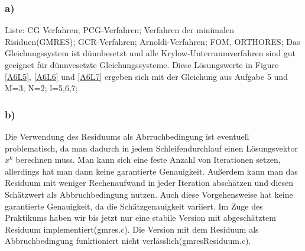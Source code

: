 \documentclass{report}
\begin{document}
	\subsubsection{a)}
	Liste: CG Verfahren; PCG-Verfahren; Verfahren der minimalen Risiduen(GMRES); GCR-Verfahren; Arnoldi-Verfahren; FOM, ORTHORES;\newline
	Das Gleichungssystem ist dünnbesetzt und alle Krylow-Unterraumverfahren sind gut geeignet f\"{u}r d\"{u}nnvesetzte Gleichungssysteme.
	Diese Lösungswerte in Figure \ref{A6L5}, \ref{A6L6} und \ref{A6L7} ergeben sich mit der Gleichung aus Aufgabe 5 und M=3; N=2; l=5,6,7;  \newline

	\subsubsection{b)}
	Die Verwendung des Residuums als Abrruchbedingung ist eventuell problematisch, da man dadurch in jedem Schleifendurchlauf einen Lösungsvektor $x^k$ berechnen muss. Man kann sich eine feste Anzahl von Iterationen setzen, allerdings hat man dann keine garantierte Genauigkeit. Außerdem kann man das Residuum mit weniger Rechenaufwand in jeder Iteration abschätzen und diesen Schätzwert als Abbruchbedingung nutzen. Auch diese Vorgehensweise hat keine garantierte Genauigkeit, da die Schätzgenauigkeit variiert. Im Zuge des Praktikums haben wir bis jetzt nur eine stabile Version mit abgeschätztem Residuum implementiert(gmres.c). Die Version mit dem Residuum als Abbruchbedingung funktioniert nicht verlässlich(gmresResiduum.c).
\end{document}
